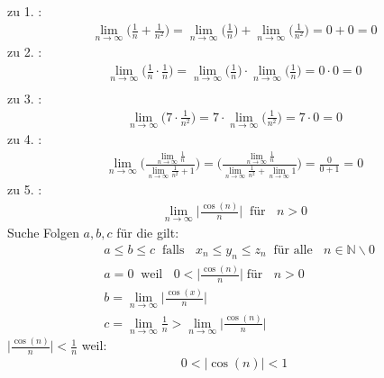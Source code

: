 \textbullet \;\; zu 1. :\\
\begin{align*}
\lim\limits_ {n\to\infty}\bigg(\frac{1}{n}+\frac{1}{n^2}\bigg)=\lim\limits_ {n\to\infty}\bigg(\frac{1}{n}\bigg)+\lim\limits_ {n\to\infty}\bigg(\frac{1}{n^2}\bigg)=0+0=0
\end{align*}
\textbullet \;\; zu 2. :\\
\begin{align*}
\lim\limits_ {n\to\infty}\bigg(\frac{1}{n}\cdot \frac{1}{n}\bigg)=\lim\limits_ {n\to\infty}\bigg(\frac{1}{n}\bigg)\cdot\lim\limits_ {n\to\infty}\bigg(\frac{1}{n}\bigg)=0\cdot 0=0\\
\end{align*}
\textbullet \;\; zu 3. :\\
\begin{align*}
\lim\limits_ {n\to\infty}\bigg(7\cdot\frac{1}{n^2}\bigg)=7\cdot \lim\limits_ {n\to\infty}\bigg(\frac{1}{n^2}\bigg)=7\cdot0 =0
\end{align*}
\textbullet \;\; zu 4. :\\
\begin{align*}
\lim\limits_ {n\to\infty}\Biggr(\frac{\lim\limits_ {n\to\infty}\frac{1}{n}}{\lim\limits_ {n\to\infty}\frac{1}{n^2}+1}\Bigg)=\Bigg(\frac{\lim\limits_ {n\to\infty}\frac{1}{n}}{\lim\limits_ {n\to\infty}\frac{1}{n^2}+\lim\limits_ {n\to\infty}1}\Bigg)=\frac{0}{0+1}=0
\end{align*}
\textbullet \;\; zu 5. :\\
\begin{align*}
\lim\limits_ {n\to\infty}\bigg|\frac{\cos(n)}{n}\bigg|\;\;\text{für }\;\;n>0
\end{align*}
Suche Folgen $ a,b,c $ für die gilt:\\
\begin{align*}
&a\leq b \leq c \;\;\text{falls }\;\; x_n\leq y_n \leq z_n \;\; \text{für alle }\;\;n\in \mathbb{N}\backslash {0}\\
&a=0\;\; \text{weil }\;\;0<\bigg|\frac{\cos(n)}{n}\bigg|\;\text{für }\;\;n>0\\
&b=\lim\limits_ {n\to\infty}\bigg|\frac{\cos(x)}{n}\bigg|\\
&c=\lim\limits_ {n\to\infty}\frac{1}{n}>\lim\limits_ {n\to\infty}\bigg|\frac{\cos(n)}{n}\bigg|
\end{align*}
$\bigg|\frac{\cos(n)}{n}\bigg|<\frac{1}{n}  $ weil:\\
\begin{align*}
0<|\cos(n)|<1
\end{align*}
